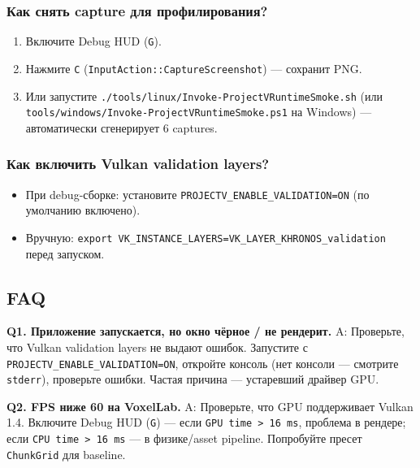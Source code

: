 \documentclass[
  11pt,a4paper,oneside]{article}
\providecommand{\tightlist}{%
  \setlength{\itemsep}{0pt}\setlength{\parskip}{0pt}}
\providecommand{\tightlist}{%
  \setlength{\itemsep}{0pt}\setlength{\parskip}{0pt}}
\begin{document}
\subsubsection{Как снять capture для профилирования?}\label{ux43aux430ux43a-ux441ux43dux44fux442ux44c-capture-ux434ux43bux44f-ux43fux440ux43eux444ux438ux43bux438ux440ux43eux432ux430ux43dux438ux44f}

\begin{enumerate}
\def\labelenumi{\arabic{enumi}.}
\tightlist
\item
  Включите Debug HUD (\texttt{G}).
\item
  Нажмите \texttt{C} (\texttt{InputAction::CaptureScreenshot}) --- сохранит PNG.
\item
  Или запустите \texttt{./tools/linux/Invoke-ProjectVRuntimeSmoke.sh} (или \texttt{tools/windows/Invoke-ProjectVRuntimeSmoke.ps1} на Windows) --- автоматически сгенерирует 6 captures.
\end{enumerate}

\subsubsection{Как включить Vulkan validation layers?}\label{ux43aux430ux43a-ux432ux43aux43bux44eux447ux438ux442ux44c-vulkan-validation-layers}

\begin{itemize}
\tightlist
\item
  При debug-сборке: установите \texttt{PROJECTV\_ENABLE\_VALIDATION=ON} (по умолчанию включено).
\item
  Вручную: \texttt{export\ VK\_INSTANCE\_LAYERS=VK\_LAYER\_KHRONOS\_validation} перед запуском.
\end{itemize}

\subsection{FAQ}\label{faq}

\textbf{Q1. Приложение запускается, но окно чёрное / не рендерит.}
A: Проверьте, что Vulkan validation layers не выдают ошибок. Запустите с \texttt{PROJECTV\_ENABLE\_VALIDATION=ON}, откройте консоль (нет консоли --- смотрите \texttt{stderr}), проверьте ошибки. Частая причина --- устаревший драйвер GPU.

\textbf{Q2. FPS ниже 60 на VoxelLab.}
A: Проверьте, что GPU поддерживает Vulkan 1.4. Включите Debug HUD (\texttt{G}) --- если \texttt{GPU\ time\ \textgreater{}\ 16\ ms}, проблема в рендере; если \texttt{CPU\ time\ \textgreater{}\ 16\ ms} --- в физике/asset pipeline. Попробуйте пресет \texttt{ChunkGrid} для baseline.
\end{document}
